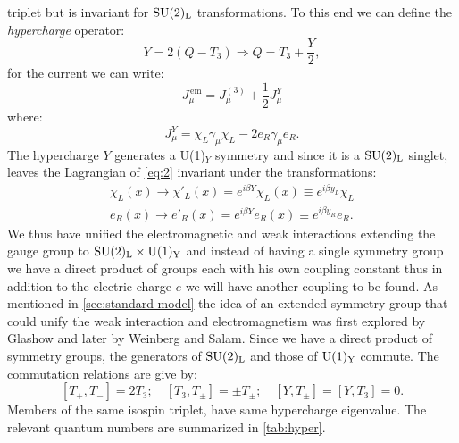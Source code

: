 triplet but is invariant for $\mathrm{SU}(2)_\mathrm{L}$ transformations. To this end we can
define the \emph{hypercharge} operator:
\begin{equation}
  \label{eq:6}
  Y = 2 ( Q - T_{3}) \Rightarrow Q = T_{3} + \frac{Y}{2},
\end{equation}
for the current we can write:
\begin{equation}
  \label{eq:7}
  J_{\mu}^\mathrm{\, em} = J_{\mu}^{(3)} + \frac{1}{2} J_{\mu}^{Y}
\end{equation}
where:
\begin{equation}
  \label{eq:8}
  J_{\mu}^{Y} = \overbar{\chi}_L \gamma_{\mu} \chi_L - 2 \overbar{e}_R
  \gamma_\mu e_R.
\end{equation}
The hypercharge $Y$ generates a U(1)$_{Y}$ symmetry and since it is a $\mathrm{SU}(2)_\mathrm{L}$
singlet, leaves the Lagrangian of \cref{eq:2} invariant under the
transformations:
\begin{equation}
  \label{eq:9}
  \begin{split}
    \chi_{L}(x) \rightarrow \chi'_{L}(x) = e^{i \beta Y} \chi_{L}(x)
    \equiv e^{i \beta y_{L}} \chi_{L} \\
    e_{R}(x) \rightarrow e'_{R}(x) = e^{i \beta Y}e_{R}(x) \equiv e^{i \beta
      y_{R}}e_{R}.
  \end{split}
\end{equation}
We thus have unified the electromagnetic and weak interactions extending the
gauge group to $\mathrm{SU}(2)_\mathrm{L} \times \mathrm{U}(1)_\mathrm{Y}$ and instead of having a single symmetry
group we have a direct product of groups each with his own coupling constant
thus in addition to the electric charge $e$ we will have another coupling to be
found. As mentioned in \cref{sec:standard-model} the idea of an extended
symmetry group that could unify the weak interaction and electromagnetism was
first explored by Glashow and later by Weinberg and Salam. Since we have a
direct product of symmetry groups, the generators of $\mathrm{SU}(2)_\mathrm{L}$ and those of
$\mathrm{U}(1)_\mathrm{Y}$ commute. The commutation relations are give by:
\begin{equation}
  \label{eq:10}
  [T_{+},T_{-}] = 2 T_{3}; \quad [T_{3},T_{\pm}] = \pm T_{\pm}; \quad
  [Y,T_{\pm}] = [Y,T_{3}] = 0.
\end{equation}
Members of the same isospin triplet, have same hypercharge eigenvalue. The
relevant quantum numbers are summarized in \cref{tab:hyper}.
